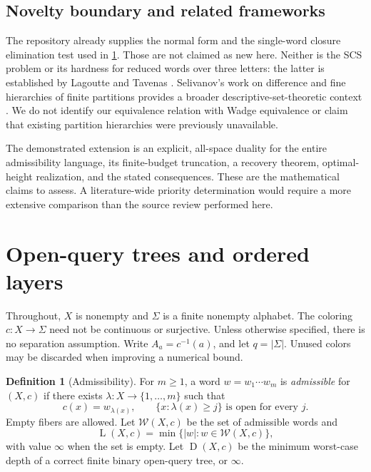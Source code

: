\documentclass[11pt,letterpaper]{article}
\numberwithin{equation}{section}
\theoremstyle{definition}
\newtheorem{definition}[definition]{Definition}
\theoremstyle{remark}
\theoremstyle{definition}
\newcommand{\W}{\mathcal W}
\newcommand{\depth}{\operatorname{D}}
\newcommand{\layers}{\operatorname{L}}
\newcommand{\len}[1]{\lvert #1\rvert}
\begin{document}
\subsection{Novelty boundary and related frameworks}

The repository already supplies the normal form and the single-word closure
elimination test used in \cref{cw:sec:normal}. Those are not claimed as new here.
Neither is the SCS problem or its hardness for reduced words over three
letters: the latter is established by Lagoutte and Tavenas \cite{LT}.
Selivanov's work on difference and fine hierarchies of finite partitions
provides a broader descriptive-set-theoretic context \cite{Selivanov}.
We do not identify our equivalence relation with Wadge equivalence or claim
that existing partition hierarchies were previously unavailable.

The demonstrated extension is an explicit, all-space duality for the entire
admissibility language, its finite-budget truncation, a recovery theorem,
optimal-height realization, and the stated consequences. These are the
mathematical claims to assess. A literature-wide priority determination would
require a more extensive comparison than the source review performed here.

\section{Open-query trees and ordered layers}
\label{cw:sec:normal}

Throughout, $X$ is nonempty and $\Sigma$ is a finite nonempty alphabet.
The coloring $c:X\to\Sigma$ need not be continuous or surjective. Unless
otherwise specified, there is no separation assumption.
Write $A_a=c^{-1}(a)$, and let $q=|\Sigma|$. Unused colors may be discarded
when improving a numerical bound.

\begin{definition}[Admissibility]
For $m\ge1$, a word $w=w_1\cdots w_m$ is \emph{admissible} for $(X,c)$ if
there exists $\lambda:X\to\{1,\ldots,m\}$ such that
\begin{equation}\label{cw:eq:layering}
 c(x)=w_{\lambda(x)},\qquad
 \{x:\lambda(x)\ge j\}\text{ is open for every }j.
\end{equation}
Empty fibers are allowed. Let $\W(X,c)$ be the set of admissible words and
\[
 \layers(X,c)=\min\{\len{w}:w\in\W(X,c)\},
\]
with value $\infty$ when the set is empty. Let $\depth(X,c)$ be the minimum
worst-case depth of a correct finite binary open-query tree, or $\infty$.
\end{definition}
\end{document}
